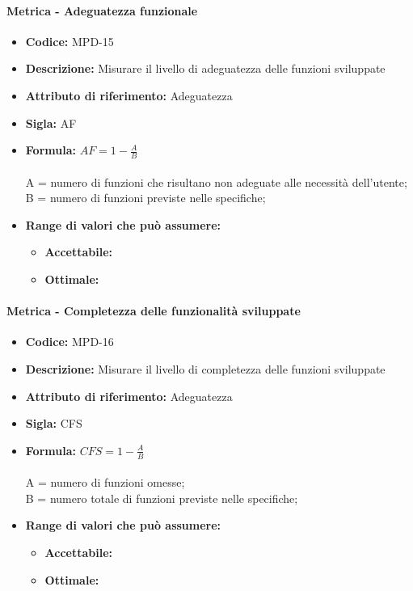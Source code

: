         \paragraph{Metrica - Adeguatezza funzionale} 
            \begin{itemize}
            \item  \textbf{Codice:} MPD-15
           \item   \textbf{Descrizione:} Misurare il livello di adeguatezza delle funzioni sviluppate 
           \item   \textbf{Attributo di riferimento:} Adeguatezza
           \item   \textbf{Sigla:} AF
           \item   \textbf{Formula:} \begin{math}AF = 1- \frac{A}{B}\end{math}\\ \\
            A = numero di funzioni che risultano non adeguate alle necessità dell'utente;\\
            B = numero di funzioni previste nelle specifiche;
            \item \textbf{Range di valori che può assumere:}
        \begin{itemize}
            \item \textbf{Accettabile:} 
            \item \textbf{Ottimale:} 
        \end{itemize}
       \end{itemize}

                   \paragraph{Metrica - Completezza delle funzionalità sviluppate} 
            \begin{itemize}
            \item  \textbf{Codice:} MPD-16
            \item  \textbf{Descrizione:} Misurare il livello di completezza delle funzioni sviluppate 
            \item  \textbf{Attributo di riferimento:} Adeguatezza
            \item  \textbf{Sigla:} CFS
            \item  \textbf{Formula:} \begin{math}CFS = 1- \frac{A}{B}\end{math}\\ \\
            A = numero di funzioni omesse;\\
            B = numero totale di funzioni previste nelle specifiche;
            \item \textbf{Range di valori che può assumere:}
        \begin{itemize}
            \item \textbf{Accettabile:} 
            \item \textbf{Ottimale:} 
        \end{itemize}
       \end{itemize}
       

